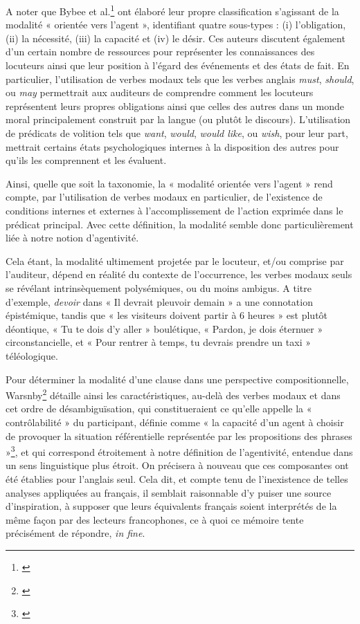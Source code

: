 A noter que Bybee et al.\footnote{\cite{bybee_evolution_1995}} ont élaboré leur propre classification s'agissant de la modalité « orientée vers l'agent », identifiant quatre sous-types : (i) l'obligation, (ii) la nécessité, (iii) la capacité et (iv) le désir. Ces auteurs discutent également d'un certain nombre de ressources pour représenter les connaissances des locuteurs ainsi que leur position à l'égard des événements et des états de fait. En particulier, l'utilisation de verbes modaux tels que les verbes anglais \textit{must}, \textit{should}, ou \textit{may} permettrait aux auditeurs de comprendre comment les locuteurs représentent leurs propres obligations ainsi que celles des autres dans un monde moral principalement construit par la langue (ou plutôt le discours). L'utilisation de prédicats de volition tels que \textit{want}, \textit{would}, \textit{would like}, ou \textit{wish}, pour leur part, mettrait certains états psychologiques internes à la disposition des autres pour qu'ils les comprennent et les évaluent. 

Ainsi, quelle que soit la taxonomie, la « modalité orientée vers l'agent » rend compte, par l'utilisation de verbes modaux en particulier, de l'existence de conditions internes et externes à l'accomplissement de l'action exprimée dans le prédicat principal. Avec cette définition, la modalité semble donc particulièrement liée à notre notion d’agentivité.

Cela étant, la modalité ultimement projetée par le locuteur, et/ou comprise par l'auditeur, dépend en réalité du contexte de l'occurrence, les verbes modaux seuls se révélant intrinsèquement polysémiques, ou du moins ambigus. A titre d’exemple, \textit{devoir} dans « Il devrait pleuvoir demain » a une connotation épistémique, tandis que « les visiteurs doivent partir à 6 heures »  est plutôt déontique, « Tu te dois d’y aller »  boulétique, « Pardon, je dois éternuer »  circonstancielle, et « Pour rentrer à temps, tu devrais prendre un taxi »  téléologique.

Pour déterminer la modalité d’une clause dans une perspective compositionnelle, Warsnby\footnote{\cite{warnsby_coding_2006}} détaille ainsi les caractéristiques, au-delà des verbes modaux et dans cet ordre de désambiguïsation, qui constitueraient ce qu'elle appelle la « contrôlabilité » du participant, définie comme « la capacité d'un agent à choisir de provoquer la situation référentielle représentée par les propositions des phrases »\footnote{\cite{klinge_impact_1996}}, et qui correspond étroitement à notre définition de l’agentivité, entendue dans un sens linguistique plus étroit. On précisera à nouveau que ces composantes ont été établies pour l'anglais seul. Cela dit, et compte tenu de l’inexistence de telles analyses appliquées au français, il semblait raisonnable d’y puiser une source d’inspiration, à supposer que leurs équivalents français soient interprétés de la même façon par des lecteurs francophones, ce à quoi ce mémoire tente précisément de répondre, \textit{in fine}.

